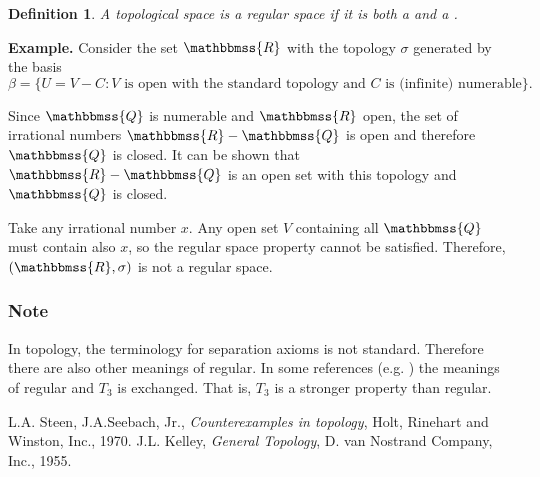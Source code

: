\documentclass[12pt]{article}
\newcommand{\R}{\mathbbmss{R}}
\newcommand{\Q}{\mathbbmss{Q}}
\newtheorem{defn}{Definition}
\begin{document}
\begin{defn}
A topological space is a \emph{regular space} if
 it is both a  and a 
 .
\end{defn}

{\bf Example.}
Consider the set $\R$ with the topology $\sigma$ generated  by the basis $$\beta=\{ U=V-C: V \mbox{ is open with the standard topology and\ } C \mbox{ is (infinite) numerable}\}.$$

Since $\Q$ is numerable and $\R$ open, the set of irrational numbers $\R-\Q$ is open and therefore $\Q$ is closed.
It can be shown that $\R-\Q$ is an open set with this topology and $\Q$ is closed. 

Take any irrational number $x$. Any open set $V$  containing all $\Q$ must contain also $x$, so the regular space property cannot be satisfied. Therefore, $(\R,\sigma)$ is not a regular space.

\subsubsection*{Note}
In topology, the terminology for separation axioms is not
standard. Therefore there are also other meanings of regular. 
In some references (e.g. \cite{kelley})
the meanings of regular and $T_3$ is exchanged. That is, 
$T_3$ is a stronger property than regular. 

 \begin{thebibliography}{9}
  L.A. Steen, J.A.Seebach, Jr.,
 \emph{Counterexamples in topology},
 Holt, Rinehart and Winston, Inc., 1970.
J.L. Kelley, \emph{General Topology}, D. van Nostrand Company, Inc., 1955.

 \end{thebibliography}
\end{document}

